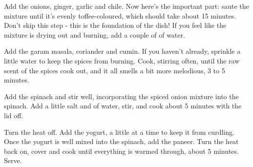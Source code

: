 {{            Add the onions, ginger, garlic and chile.
            Now here's the important part: saute the mixture until it's evenly toffee-coloured, which should take about 15 minutes.
            Don't skip this step - this is the foundation of the dish!
            If you feel like the mixture is drying out and burning, add a couple of \tablespoons of water.
        \item Add the garam masala, coriander and cumin.
            If you haven't already, sprinkle a little water to keep the spices from burning.
            Cook, stirring often, until the raw scent of the spices cook out, and it all smells a bit more melodious, 3 to 5 minutes.
        \item Add the spinach and stir well, incorporating the spiced onion mixture into the spinach.
            Add a little salt and \half \cup of water, stir, and cook about 5 minutes with the lid off.
        \item Turn the heat off.
            Add the yogurt, a little at a time to keep it from curdling.
            Once the yogurt is well mixed into the spinach, add the paneer.
            Turn the heat back on, cover and cook until everything is warmed through, about 5 minutes. Serve.
    }
}
